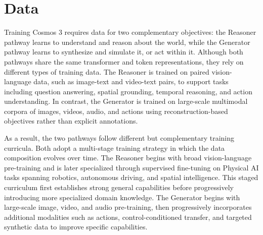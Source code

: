 \section{Data}
\label{sec::data}

Training Cosmos 3 requires data for two complementary objectives: the Reasoner pathway learns to understand and reason about the world, while the Generator pathway learns to synthesize and simulate it, or act within it. Although both pathways share the same transformer and token representations, they rely on different types of training data. The Reasoner is trained on paired vision-language data, such as image-text and video-text pairs, to support tasks including question answering, spatial grounding, temporal reasoning, and action understanding. In contrast, the Generator is trained on large-scale multimodal corpora of images, videos, audio, and actions using reconstruction-based objectives rather than explicit annotations.

As a result, the two pathways follow different but complementary training curricula. Both adopt a multi-stage training strategy in which the data composition evolves over time. The Reasoner begins with broad vision-language pre-training and is later specialized through supervised fine-tuning on Physical AI tasks spanning robotics, autonomous driving, and spatial intelligence. This staged curriculum first establishes strong general capabilities before progressively introducing more specialized domain knowledge. The Generator begins with large-scale image, video, and audio pre-training, then progressively incorporates additional modalities such as actions, control-conditioned transfer, and targeted synthetic data to improve specific capabilities.



